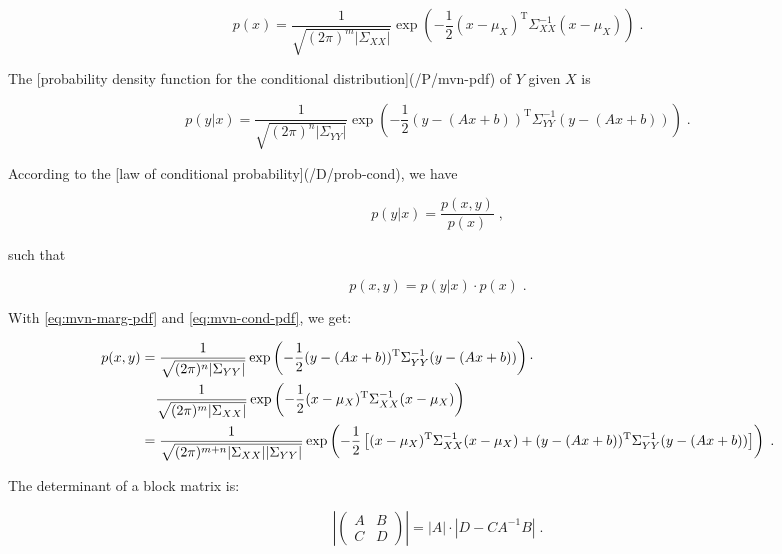 \documentclass[a4paper,12pt]{article}
\begin{document}
\begin{equation} \label{eq:mvn-marg-pdf}
p(x) = \frac{1}{\sqrt{(2\pi)^m |\Sigma_{XX}|}} \exp\left(-\frac{1}{2} (x-\mu_X)^\mathrm{T} \Sigma_{XX}^{-1} (x-\mu_X)\right) \; .
\end{equation}

The [probability density function for the conditional distribution](/P/mvn-pdf) of $Y$ given $X$ is

\begin{equation} \label{eq:mvn-cond-pdf}
p(y|x) = \frac{1}{\sqrt{(2\pi)^n |\Sigma_{YY}|}} \exp\left(-\frac{1}{2} (y-(Ax+b))^\mathrm{T} \Sigma_{YY}^{-1} (y-(Ax+b))\right) \; .
\end{equation}

According to the [law of conditional probability](/D/prob-cond), we have

\begin{equation} \label{eq:prob-cond}
p(y|x) = \frac{p(x,y)}{p(x)} \; ,
\end{equation}

such that

\begin{equation} \label{eq:prob-joint}
p(x,y) = p(y|x) \cdot p(x) \; .
\end{equation}

With \eqref{eq:mvn-marg-pdf} and \eqref{eq:mvn-cond-pdf}, we get:

\begin{equation} \label{eq:mvn-joint-pdf-s1}
\begin{split}
   p(x,y)
&= \frac{1}{\sqrt{(2\pi)^n |\Sigma_{YY}|}} \exp\left(-\frac{1}{2} (y-(Ax+b))^\mathrm{T} \Sigma_{YY}^{-1} (y-(Ax+b))\right) \cdot \\
&\hphantom{=}\; \frac{1}{\sqrt{(2\pi)^m |\Sigma_{XX}|}} \exp\left(-\frac{1}{2} (x-\mu_X)^\mathrm{T} \Sigma_{XX}^{-1} (x-\mu_X)\right) \\
&= \frac{1}{\sqrt{(2\pi)^{m+n} |\Sigma_{XX}| |\Sigma_{YY}|}} \exp\left(-\frac{1}{2} \left[ (x-\mu_X)^\mathrm{T} \Sigma_{XX}^{-1} (x-\mu_X) + (y-(Ax+b))^\mathrm{T} \Sigma_{YY}^{-1} (y-(Ax+b)) \right] \right) \; .
\end{split}
\end{equation}

The determinant of a block matrix is:

\begin{equation} \label{eq:block-det}
  \left| \begin{pmatrix} A & B \\ C & D \end{pmatrix} \right|
= |A| \cdot | D - C A^{-1} B | \; .
\end{equation}
\end{document}
